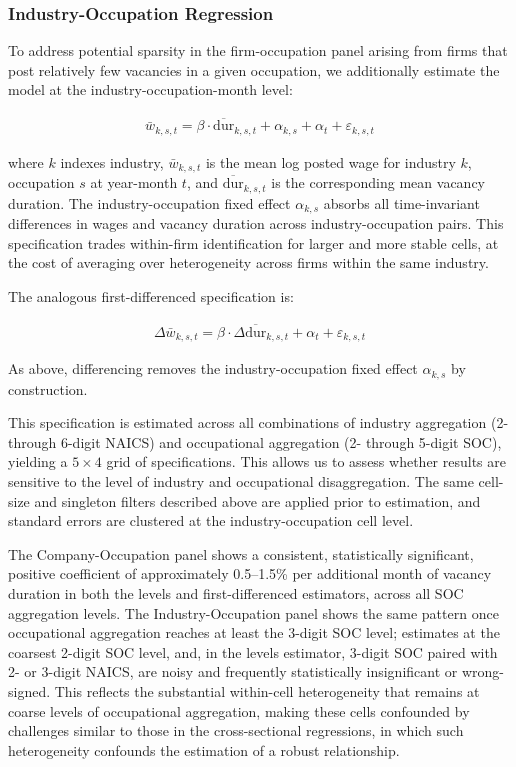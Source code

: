 \subsubsection{Industry-Occupation Regression}

To address potential sparsity in the firm-occupation panel arising from 
firms that post relatively few vacancies in a given occupation, we 
additionally estimate the model at the industry-occupation-month level:

\begin{align}
\bar{w}_{k,s,t} = \beta \cdot \overline{\text{dur}}_{k,s,t} + \alpha_{k,s} + \alpha_t + \varepsilon_{k,s,t}
\end{align}

where $k$ indexes industry, $\bar{w}_{k,s,t}$ is the mean log posted wage 
for industry $k$, occupation $s$ at year-month $t$, and 
$\overline{\text{dur}}_{k,s,t}$ is the corresponding mean vacancy duration. 
The industry-occupation fixed effect $\alpha_{k,s}$ absorbs all 
time-invariant differences in wages and vacancy duration across 
industry-occupation pairs. This specification trades within-firm
identification for larger and more stable cells, at the cost of
averaging over heterogeneity across firms within the same industry.

The analogous first-differenced specification is:

\begin{align}
\Delta \bar{w}_{k,s,t} = \beta \cdot \Delta \overline{\text{dur}}_{k,s,t} + \alpha_t + \varepsilon_{k,s,t}
\end{align}

As above, differencing removes the industry-occupation fixed effect $\alpha_{k,s}$ by construction.

This specification is estimated across all combinations of
industry aggregation (2- through 6-digit NAICS) and occupational 
aggregation (2- through 5-digit SOC), yielding a $5 \times 4$ grid of 
specifications. This allows us to assess whether results are sensitive to
the level of industry and occupational disaggregation. The same cell-size
and singleton filters described above are applied prior to estimation, and
standard errors are clustered at the industry-occupation cell level.

The Company-Occupation panel shows a consistent, statistically significant, positive coefficient of approximately 0.5--1.5\% per additional month of vacancy duration in both the levels and first-differenced estimators, across all SOC aggregation levels. The Industry-Occupation panel shows the same pattern once occupational aggregation reaches at least the 3-digit SOC level; estimates at the coarsest 2-digit SOC level, and, in the levels estimator, 3-digit SOC paired with 2- or 3-digit NAICS, are noisy and frequently statistically insignificant or wrong-signed. This reflects the substantial within-cell heterogeneity that remains at coarse levels of occupational aggregation, making these cells confounded by challenges similar to those in the cross-sectional regressions, in which such heterogeneity confounds the estimation of a robust relationship.

